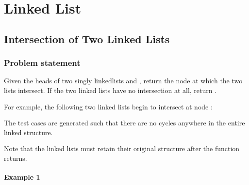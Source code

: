 \documentclass[letterpaper,12pt,english]{book}
\begin{document}
\sphinxstepscope


\chapter{Linked List}
\label{\detokenize{Linked_List/index:linked-list}}\label{\detokenize{Linked_List/index::doc}}
\sphinxstepscope


\section{Intersection of Two Linked Lists}
\label{\detokenize{Linked_List/02_LL_160_Intersection_of_Two_Linked_Lists:intersection-of-two-linked-lists}}\label{\detokenize{Linked_List/02_LL_160_Intersection_of_Two_Linked_Lists::doc}}

\subsection{Problem statement\sphinxfootnotemark[18]}
\label{\detokenize{Linked_List/02_LL_160_Intersection_of_Two_Linked_Lists:problem-statement}}%
\begin{footnotetext}[18]\sphinxAtStartFootnote
{}
%
\end{footnotetext}\ignorespaces 
\sphinxAtStartPar
Given the heads of two singly linked\sphinxhyphen{}lists  and , return the node at which the two lists intersect. If the two linked lists have no intersection at all, return .

\sphinxAtStartPar
For example, the following two linked lists begin to intersect at node :

\sphinxAtStartPar
{}

\sphinxAtStartPar
The test cases are generated such that there are no cycles anywhere in the entire linked structure.

\sphinxAtStartPar
Note that the linked lists must retain their original structure after the function returns.


\subsubsection{Example 1}
\label{\detokenize{Linked_List/02_LL_160_Intersection_of_Two_Linked_Lists:example-1}}
\sphinxAtStartPar
{}
\end{document}
